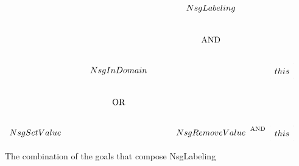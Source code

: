 \documentclass{article}
\begin{document}
\newcommand{\vl}[1]{#1}

\begin{figure}[htb]
\[
\entrymodifiers={+<1em>[F]}
\xymatrix{
    *{}       &      *{}       & \vl{NsgLabeling}\ar[ddl]\ar[ddr] &                     *{}                     \\
    *{}       &      *{}       &           *{\txt{AND}}           &                     *{}                     \\
    *{}       & \vl{NsgInDomain}\ar[ddl]\ar[ddr]  &   *{}         & *+<1em>[F--]{\vl{this}}\ar@{.>}@/_2em/[uul] \\
    *{}       &  *{\txt{OR}}   &               *{}                &            *{}                              \\
\vl{NsgSetValue} &   *{}       &  \vl{NsgRemoveValue} \ar@{.}[r]^{\txt{\scriptsize\hspace{24pt} AND}} & *+<1em>[F--]{\vl{this}}\ar@{.>}@/_2em/[uull]
}
\]
\caption{The combination of the goals that compose \vl{NsgLabeling}}
\end{figure}
\end{document}
